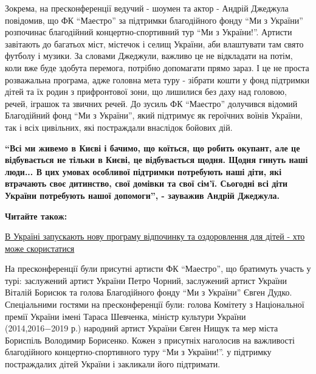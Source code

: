 
Зокрема, на пресконференції ведучий - шоумен та актор - Андрій Джеджула
повідомив, що ФК \enquote{Маестро} за підтримки благодійного фонду \enquote{Ми з України}
розпочинає благодійний концертно-спортивний тур \enquote{Ми з України!}. Артисти
завітають до багатьох міст, містечок і селищ України, аби влаштувати там свято
футболу і музики. За словами Джеджули, важливо це не відкладати на потім, коли
вже буде здобута перемога, потрібно допомагати прямо зараз. І це не проста
розважальна програма, адже головна мета туру - зібрати кошти у фонд підтримки
дітей та їх родин з прифронтової зони, що лишилися без даху над головою, речей,
іграшок та звичних речей. До зусиль ФК \enquote{Маестро} долучився відомий Благодійний
фонд \enquote{Ми з України}, який підтримує як героїчних воїнів України, так і всіх
цивільних, які постраждали внаслідок бойових дій.

\begin{leftbar}
  \begingroup
    \bfseries
\enquote{Всі ми живемо в Києві і бачимо, що коїться, що робить окупант, але це
відбувається не тільки в Києві, це відбувається щодня. Щодня гинуть
наші люди... В цих умовах особливої підтримки потребують наші діти, які
втрачають своє дитинство, свої домівки та свої сім'ї. Сьогодні всі діти
України потребують нашої допомоги}, - зауважив Андрій Джеджула.
  \endgroup
\end{leftbar}

\textbf{Читайте також:} 

\href{https://donbas24.news/news/v-ukrayini-zapuskayut-novu-programu-vidpocinku-ta-ozdorovlennya-dlya-ditei-xto-moze-skoristatisya}{В Україні запускають нову програму відпочинку та оздоровлення для дітей - хто може скористатися}


На пресконференції були присутні артисти ФК \enquote{Маестро}, що братимуть участь у
турі: заслужений артист України Петро Чорний, заслужений артист України Віталій
Борисюк та голова Благодійного фонду \enquote{Ми з України} Євген Дудко. Спеціальними
гостями на пресконференції були: голова Комітету з Національної премії України
імені Тараса Шевченка, міністр культури України (2014,2016−2019 р.) народний
артист України Євген Нищук та мер міста Бориспіль Володимир Борисенко. Кожен з
присутніх наголосив на важливості благодійного концертно-спортивного туру \enquote{Ми з
України!}. у підтримку постраждалих дітей України і закликали його підтримати.

